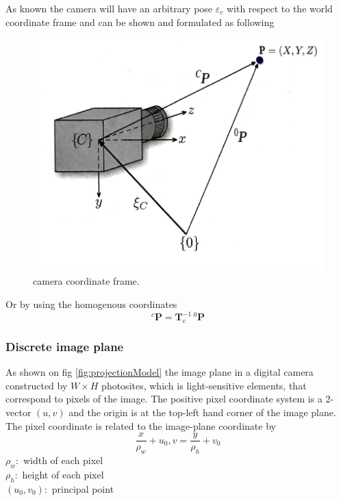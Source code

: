 \documentclass[journal,final,a4paper,twoside]{PS}
\begin{document}
As known the camera will have an arbitrary pose $\varepsilon_c$ with respect to the world coordinate frame and can be shown and formulated as following 
\begin{figure}[h]
\begin{center}
\includegraphics[scale=0.5]{./pics/cameraCoordinateFrame.png}
\caption{camera coordinate frame\cite{Corke}.}
\label{fig:cameraFrame}
\end{center}
\end{figure}

Or by using the homogenous coordinates 
\begin{equation}
{}^{c}\textbf{P}=\textbf{T}_c^{-1}\, {}^{0}\textbf{P}
\end{equation}

\subsubsection{Discrete image plane}
As shown on fig \ref{fig:projectionModel} the image plane in a digital camera constructed by $ W\times H $ photosites, which is light-sensitive elements, that correspond to pixels of the image.  The positive pixel coordinate system is a 2-vector $(u,v)$ and the origin is at the top-left hand corner of the image plane.
The pixel coordinate is related to the image-plane coordinate by
$$\frac{x}{\rho_w} + u_0, v = \frac{y}{\rho_h}+v_0$$
$\rho_w : $ width of each pixel
\\
$\rho_h : $ height of each pixel
\\
$(u_0,v_0) : $ principal point
\\
\end{document}
